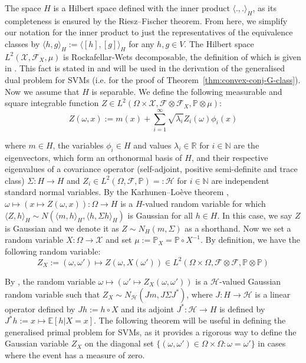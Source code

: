 \documentclass{article}
\begin{document}
The space $H$ is a Hilbert space defined with the inner product $\langle . , . \rangle_H$, as its completeness is ensured by the Riesz–Fischer theorem. From here, we simplify our notation for the inner product to just the representatives of the equivalence classes by $\langle h , g \rangle_H := \langle [h], [g] \rangle_H$ for any $h , g \in V$. The Hilbert space $L^2(\mathcal{X} , \mathcal{F}_X , \mu)$ is Rockafellar-Wets decomposable, the definition of which is given in \cite[Definition 14.59]{Rockafellar1997-gr}. This fact is stated in \cite[Page 677]{Rockafellar1997-gr} and will be used in the derivation of the generalised dual problem for SVMs (i.e. for the proof of Theorem~\ref{thm:convex-conj-G-class}). Now we assume that $H$ is separable. We define the following measurable and square integrable function $Z \in L^2(\Omega \times \mathcal{X} , \mathcal{F} \otimes \mathcal{F}_X , \mathbb{P} \otimes \mu)$: 
\begin{equation}
Z(\omega , x) := m(x) + \sum_{i = 1}^{\infty} \sqrt{\lambda_i} Z_i (\omega) \phi_i (x)
\end{equation}

where $m \in H$, the variables $\phi_i \in H$ and values $\lambda_i \in \mathbb{R}$ for $i \in \mathbb{N}$ are the eigenvectors, which form an orthonormal basis of $H$, and their respective eigenvalues of a covariance operator (self-adjoint, positive semi-definite and trace class) $\Sigma : H\rightarrow H$ and $Z_i \in L^2(\Omega, \mathcal{F}, \mathbb{P}) =: \mathcal{H}$ for $i \in \mathbb{N}$ are independent standard normal variables. By the Karhunen–Loève theorem \cite[Proposition 2.18]{Da_Prato_Zabczyk_1992}, $\omega \mapsto (x \mapsto Z (\omega , x)) : \Omega \rightarrow H$ is a $H$-valued random variable for which $\langle Z , h \rangle_H \sim N (\langle m , h \rangle_H ,\langle h , \Sigma h \rangle_H)$ is Gaussian for all $h \in H$. In this case, we say $Z$ is Gaussian and we denote it as $Z \sim N_H (m , \Sigma)$ as a shorthand. Now we set a random variable $X : \Omega \rightarrow \mathcal{X}$ and set $\mu := \mathbb{P}_X = \mathbb{P} \circ X^{- 1}$. By definition, we have the following random variable:
\begin{equation}\label{measurable-gaussian}
Z_X := (\omega , \omega') \mapsto Z(\omega , X(\omega')) \in L^2(\Omega \times \Omega , \mathcal{F} \otimes \mathcal{F} , \mathbb{P} \otimes \mathbb{P})
\end{equation}

By \cite[Proposition 1.18]{Da_Prato2006-cy}, the random variable $\omega \mapsto (\omega' \mapsto Z_X (\omega ,\omega'))$ is a $\mathcal{H}$-valued Gaussian random variable such that $Z_X \sim N_{\mathcal{H}}(J m , J \Sigma J^{*})$, where $J : H \rightarrow \mathcal{H}$ is a linear operator defined by $J h := h \circ X$ and its adjoint $J^{*} : \mathcal{H} \rightarrow H$ is defined by $J^{*} h := x \mapsto \mathbb{E}[h | X = x]$. The following theorem will be useful in defining the generalised primal problem for SVMs, as it provides a rigorous way to define the Gaussian variable $Z_X$ on the diagonal set $\{(\omega , \omega') \in \Omega \times \Omega : \omega = \omega'\}$ in cases where the event has a measure of zero.
\end{document}
